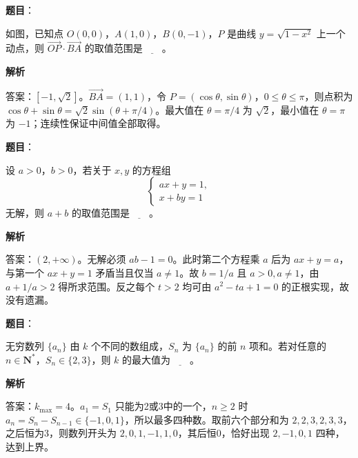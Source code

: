 \begin{answer}

\textbf{题目}：

如图，已知点 \(O(0,0)\)，\(A(1,0)\)，\(B(0,-1)\)，\(P\) 是曲线 \(y=\sqrt{1-x^2}\) 上一个动点，则 \(\overrightarrow{OP}\cdot\overrightarrow{BA}\) 的取值范围是\(\underline{\qquad}\)。
\nopagebreak[4]
\begin{center}\end{center}
\nopagebreak[4]
\textbf{解析}

答案：\([-1,\sqrt2]\)。\(\overrightarrow{BA}=(1,1)\)，令 \(P=(\cos\theta,\sin\theta)\)，\(0\le\theta\le\pi\)，则点积为 \(\cos\theta+\sin\theta=\sqrt2\sin(\theta+\pi/4)\)。最大值在 \(\theta=\pi/4\) 为 \(\sqrt2\)，最小值在 \(\theta=\pi\) 为 \(-1\)；连续性保证中间值全部取得。


\end{answer}
\begin{answer}

\textbf{题目}：

设 \(a>0\)，\(b>0\)，若关于 \(x,y\) 的方程组
\nopagebreak[4]
\[
\begin{cases}
ax+y=1,\\
x+by=1
\end{cases}
\]
无解，则 \(a+b\) 的取值范围是\(\underline{\qquad}\)。

\textbf{解析}

答案：\((2,+\infty)\)。无解必须 \(ab-1=0\)。此时第二个方程乘 \(a\) 后为 \(ax+y=a\)，与第一个 \(ax+y=1\) 矛盾当且仅当 \(a\ne1\)。故 \(b=1/a\) 且 \(a>0,a\ne1\)，由 \(a+1/a>2\) 得所求范围。反之每个 \(t>2\) 均可由 \(a^2-ta+1=0\) 的正根实现，故没有遗漏。


\end{answer}
\begin{answer}

\textbf{题目}：

无穷数列 \(\{a_n\}\) 由 \(k\) 个不同的数组成，\(S_n\) 为 \(\{a_n\}\) 的前 \(n\) 项和。若对任意的 \(n\in\mathbf N^*\)，\(S_n\in\{2,3\}\)，则 \(k\) 的最大值为\(\underline{\qquad}\)。

\textbf{解析}

答案：\(k_{\max}=4\)。\(a_1=S_1\) 只能为2或3中的一个，\(n\ge2\) 时 \(a_n=S_n-S_{n-1}\in\{-1,0,1\}\)，所以最多四种数。取前六个部分和为 \(2,2,3,2,3,3\)，之后恒为3，则数列开头为 \(2,0,1,-1,1,0\)，其后恒0，恰好出现 \(2,-1,0,1\) 四种，达到上界。


\end{answer}
